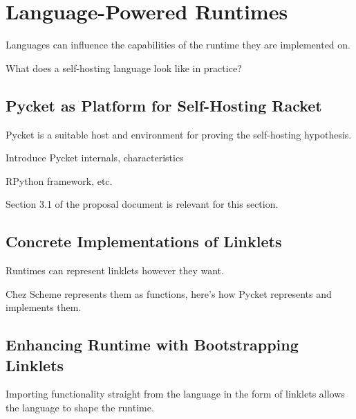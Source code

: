 \chapter{Language-Powered Runtimes}
	\begin{chapterpoint}
		Languages can influence the capabilities of the runtime they are implemented on.

		What does a self-hosting language look like in practice?

	\end{chapterpoint}

	\section{Pycket as Platform for Self-Hosting Racket}

		\label{section:language-powered-runtimes:pycket-as-platform}

		\begin{mainpoint}
			Pycket is a suitable host and environment for proving the self-hosting hypothesis.
		\end{mainpoint}

		\begin{todo}[TODO]
			Introduce Pycket internals, characteristics

			RPython framework, etc.
		\end{todo}

		\begin{todo}[Import]
				Section 3.1 of the proposal document is relevant for this section.
		\end{todo}

	\section{Concrete Implementations of Linklets}

		\begin{mainpoint}
			Runtimes can represent linklets however they want.

			Chez Scheme represents them as functions, here's how Pycket represents and implements them.
		\end{mainpoint}

	\section{Enhancing Runtime with Bootstrapping Linklets}
		\begin{mainpoint}
			Importing functionality straight from the language in the form of linklets allows the language to shape the runtime.
		\end{mainpoint}
